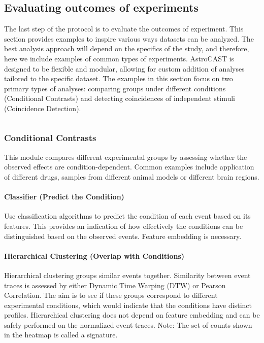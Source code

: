 \subsection{Evaluating outcomes of experiments}


The last step of the protocol is to evaluate the outcomes of experiment. This section provides examples to inspire various ways datasets can be analyzed. The best analysis approach will depend on the specifics of the study, and therefore, here we include examples of common types of experiments. AstroCAST is designed to be flexible and modular, allowing for custom addition of analyses tailored to the specific dataset. The examples in this section focus on two primary types of analyses: comparing groups under different conditions (Conditional Contrasts) and detecting coincidences of independent stimuli (Coincidence Detection).

\begin{lstlisting}[style=pyStyle]

\end{lstlisting}

\subsubsection{Conditional Contrasts}
This module compares different experimental groups by assessing whether the observed effects are condition-dependent. Common examples include application of different drugs, samples from different animal models or different brain regions.

\paragraph{Classifier (Predict the Condition)}
Use classification algorithms to predict the condition of each event based on its features. This provides an indication of how effectively the conditions can be distinguished based on the observed events. Feature embedding is necessary.


\paragraph{Hierarchical Clustering (Overlap with Conditions)}
Hierarchical clustering groups similar events together. Similarity between event traces is assessed by either Dynamic Time Warping (DTW) or Pearson Correlation. The aim is to see if these groups correspond to different experimental conditions, which would indicate that the conditions have distinct profiles. Hierarchical clustering does not depend on feature embedding and can be safely performed on the normalized event traces. Note: The set of counts shown in the heatmap is called a signature.

